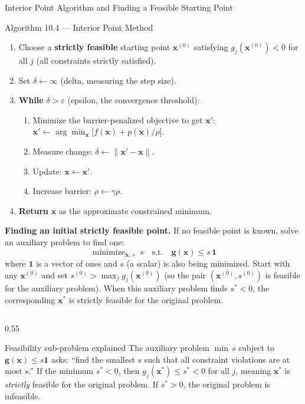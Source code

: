 \documentclass[aspectratio=169,10pt]{beamer}
\newcommand{\bx}{\mathbf{x}}
\DeclareMathOperator*{\minimize}{minimize}
\begin{document}
\begin{frame}[allowframebreaks]{Interior Point Algorithm and Finding a Feasible Starting Point}

  \begin{block}{Algorithm 10.4 --- Interior Point Method}
    \begin{enumerate}
      \item Choose a \textbf{strictly feasible} starting point $\bx^{(0)}$
            satisfying $g_j(\bx^{(0)}) < 0$ for all $j$ (all constraints
            strictly satisfied).
      \item Set $\delta \leftarrow \infty$ (delta, measuring the step size).
      \item \textbf{While} $\delta > \varepsilon$ (epsilon, the convergence
            threshold):
            \begin{enumerate}
              \item Minimize the barrier-penalized objective to get $\bx'$:
                    $\bx' \leftarrow \arg\min_\bx\bigl[f(\bx) + p(\bx)/\rho\bigr]$.
              \item Measure change: $\delta \leftarrow \|\bx' - \bx\|$.
              \item Update: $\bx \leftarrow \bx'$.
              \item Increase barrier: $\rho \leftarrow \gamma\rho$.
            \end{enumerate}
      \item \textbf{Return} $\bx$ as the approximate constrained minimum.
    \end{enumerate}
  \end{block}

  \textbf{Finding an initial strictly feasible point.}  If no feasible point
  is known, solve an auxiliary problem to find one:
  \[
    \minimize_{\bx,\,s}\; s
    \quad\text{s.t.}\quad
    \mathbf{g}(\bx) \le s\,\mathbf{1}
  \]
  where $\mathbf{1}$ is a vector of ones and $s$ (a scalar) is also being
  minimized.  Start with any $\bx^{(0)}$ and set
  $s^{(0)} > \max_j g_j(\bx^{(0)})$ (so the pair $(\bx^{(0)}, s^{(0)})$ is
  feasible for the auxiliary problem).  When this auxiliary problem finds
  $s^* < 0$, the corresponding $\bx^*$ is strictly feasible for the original
  problem.

  \framebreak

  \begin{columns}
    \begin{column}{0.55\textwidth}
      \begin{exampleblock}{Feasibility sub-problem explained}
        The auxiliary problem $\min\, s$ subject to $\mathbf{g}(\bx) \le s\mathbf{1}$
        asks: ``find the smallest $s$ such that all constraint violations
        are at most $s$.''  If the minimum $s^* < 0$, then
        $g_j(\bx^*) \le s^* < 0$ for all $j$, meaning $\bx^*$ is
        \emph{strictly} feasible for the original problem.  If $s^* > 0$,
        the original problem is infeasible.
      \end{exampleblock}


\end{column}
\end{columns}
\end{frame}
\end{document}
